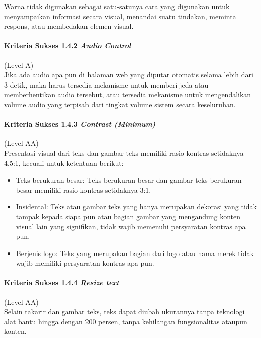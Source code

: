 \documentclass[a4paper,twoside]{article}
\begin{document}
\begin{enumerate}
		Warna tidak digunakan sebagai satu-satunya cara yang digunakan untuk menyampaikan informasi secara visual, menandai suatu tindakan, meminta respons, atau membedakan elemen visual.

		\paragraph{Kriteria Sukses 1.4.2 \textit{Audio Control}}
		\label{sec:kriteria_sukses_1.4.2}
		(Level A)\\

		Jika ada audio apa pun di halaman web yang diputar otomatis selama lebih dari 3 detik, maka harus tersedia mekanisme untuk memberi jeda atau memberhentikan audio tersebut, atau tersedia mekanisme untuk mengendalikan volume audio yang terpisah dari tingkat volume sistem secara keseluruhan.

		\paragraph{Kriteria Sukses 1.4.3 \textit{Contrast (Minimum)}}
		\label{sec:kriteria_sukses_1.4.3}
		(Level AA)\\

		Presentasi visual dari teks dan gambar teks memiliki rasio kontras setidaknya 4,5:1, kecuali untuk ketentuan berikut:

		\begin{itemize}
			\item Teks berukuran besar: Teks berukuran besar dan gambar teks berukuran besar memiliki rasio kontras setidaknya 3:1.
			\item Insidental: Teks atau gambar teks yang hanya merupakan dekorasi yang tidak tampak kepada siapa pun atau bagian gambar yang mengandung konten visual lain yang signifikan, tidak wajib memenuhi persyaratan kontras apa pun.
			\item Berjenis logo: Teks yang merupakan bagian dari logo atau nama merek tidak wajib memiliki persyaratan kontras apa pun.
		\end{itemize}

		\paragraph{Kriteria Sukses 1.4.4 \textit{Resize text}}
		\label{sec:kriteria_sukses_1.4.4}
		(Level AA)\\

		Selain takarir dan gambar teks, teks dapat diubah ukurannya tanpa teknologi alat bantu hingga dengan 200 persen, tanpa kehilangan fungsionalitas ataupun konten.


\end{enumerate}
\end{document}
